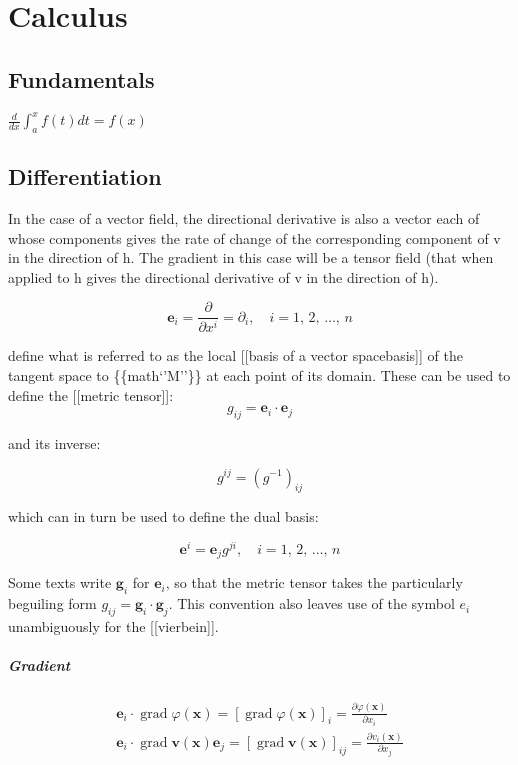\hypertarget{calculus}{%
\section{Calculus}\label{calculus}}

\hypertarget{fundamentals}{%
\subsection{Fundamentals}\label{fundamentals}}

\(\frac{d}{d x} \int_{a}^{x} f(t) d t=f(x)\)

\hypertarget{differentiation}{%
\subsection{Differentiation}\label{differentiation}}

In the case of a vector field, the directional derivative is also a
vector each of whose components gives the rate of change of the
corresponding component of v in the direction of h. The gradient in this
case will be a tensor field (that when applied to h gives the
directional derivative of v in the direction of h).

\[\mathbf{e}_i = \frac{\partial}{\partial x^i} = \partial_i,\quad i = 1,\, 2,\, \dots,\, n\]

define what is referred to as the local {[}{[}basis of a vector
space\textbar basis{]}{]} of the tangent space to
\{\{math\textbar{}`'M''\}\} at each point of its domain. These can be
used to define the {[}{[}metric tensor{]}{]}:
\[g_{ij} = \mathbf{e}_i \cdot \mathbf{e}_j\]

and its inverse:

\[g^{ij} = \left( g^{-1} \right)_{ij}\]

which can in turn be used to define the dual basis:

\[\mathbf{e}^i = \mathbf{e}_j g^{ji},\quad i = 1,\, 2,\, \dots,\, n\]

Some texts write \(\mathbf{g}_i\) for \(\mathbf{e}_i\), so that the
metric tensor takes the particularly beguiling form
\(g_{ij} = \mathbf{g}_i \cdot \mathbf{g}_j\). This convention also
leaves use of the symbol \(e_i\) unambiguously for the
{[}{[}vierbein{]}{]}.

\hypertarget{gradient}{%
\subparagraph{Gradient}\label{gradient}}

\[ \begin{array}{c}{\mathbf{e}_{i} \cdot \operatorname{grad} \varphi(\mathbf{x})=[\operatorname{grad} \varphi(\mathbf{x})]_{i}=\frac{\partial \varphi(\mathbf{x})}{\partial x_{i}}}\\{\mathbf{e}_{i} \cdot \operatorname{grad} \mathbf{v}(\mathbf{x}) \mathbf{e}_{j}=[\operatorname{grad} \mathbf{v}(\mathbf{x})]_{i j}=\frac{\partial v_{i}(\mathbf{x})}{\partial x_{j}}}\end{array}\]


